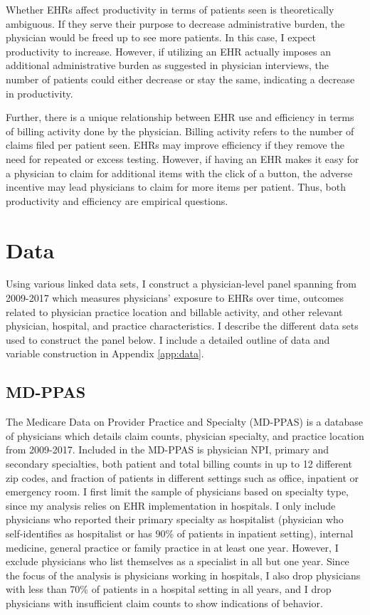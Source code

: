 \documentclass[12pt]{article}
\begin{document}
Whether EHRs affect productivity in terms of patients seen is theoretically ambiguous. If they serve their purpose to decrease administrative burden, the physician would be freed up to see more patients. In this case, I expect productivity to increase. However, if utilizing an EHR actually imposes an additional administrative burden as suggested in physician interviews, the number of patients could either decrease or stay the same, indicating a decrease in productivity.  

Further, there is a unique relationship between EHR use and efficiency in terms of billing activity done by the physician. Billing activity refers to the number of claims filed per patient seen. EHRs may improve efficiency if they remove the need for repeated or excess testing. However, if having an EHR makes it easy for a physician to claim for additional items with the click of a button, the adverse incentive may lead physicians to claim for more items per patient. Thus, both productivity and efficiency are empirical questions. 




\section{Data}

Using various linked data sets, I construct a physician-level panel spanning from 2009-2017 which measures physicians' exposure to EHRs over time, outcomes related to physician practice location and billable activity, and other relevant physician, hospital, and practice characteristics. I describe the different data sets used to construct the panel below. I include a detailed outline of data and variable construction in Appendix \ref{app:data}.

\subsection{MD-PPAS}

The Medicare Data on Provider Practice and Specialty (MD-PPAS) is a database of physicians which details claim counts, physician specialty, and practice location from 2009-2017. Included in the MD-PPAS is physician NPI, primary and secondary specialties, both patient and total billing counts in up to 12 different zip codes, and fraction of patients in different settings such as office, inpatient or emergency room. I first limit the sample of physicians based on specialty type, since my analysis relies on EHR implementation in hospitals. I only include physicians who reported their primary specialty as hospitalist (physician who self-identifies as hospitalist or has 90\% of patients in inpatient setting), internal medicine, general practice or family practice in at least one year. However, I exclude physicians who list themselves as a specialist in all but one year. Since the focus of the analysis is physicians working in hospitals, I also drop physicians with less than 70\% of patients in a hospital setting in all years, and I drop physicians with insufficient claim counts to show indications of behavior.
\end{document}
